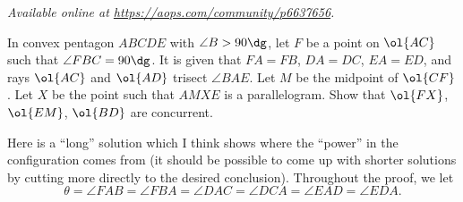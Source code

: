 \textsl{Available online at \url{https://aops.com/community/p6637656}.}
\begin{mdframed}[style=mdpurplebox,frametitle={Problem statement}]
In convex pentagon $ABCDE$ with $\angle B > 90\dg$,
let $F$ be a point on $\ol{AC}$ such that $\angle FBC = 90\dg$.
It is given that $FA=FB$, $DA=DC$, $EA=ED$,
and rays $\ol{AC}$ and $\ol{AD}$ trisect $\angle BAE$.
Let $M$ be the midpoint of $\ol{CF}$.
Let $X$ be the point such that $AMXE$ is a parallelogram.
Show that $\ol{FX}$, $\ol{EM}$, $\ol{BD}$ are concurrent.
\end{mdframed}
Here is a ``long'' solution which I think
shows where the ``power'' in the configuration comes from
(it should be possible to come up with shorter solutions
by cutting more directly to the desired conclusion).
Throughout the proof, we let
\[ \theta = \angle FAB = \angle FBA = \angle DAC = \angle DCA
  = \angle EAD = \angle EDA. \]

